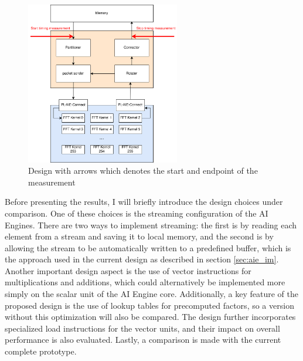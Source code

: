 \begin{figure}[h]
    \centering
    \includegraphics[width=0.6\textwidth]{images/timing.png}
    \captionsetup{justification=centering}
    \caption{Design with arrows which denotes the start and endpoint of the measurement}
    \label{fig:timing}
\end{figure}

Before presenting the results, I will briefly introduce the design choices under comparison. One of these choices is the streaming configuration of the AI Engines. There are two ways to implement streaming: the first is by reading each element from a stream and saving it to local memory, and the second is by allowing the stream to be automatically written to a predefined buffer, which is the approach used in the current design as described in section \ref{sec:aie_im}. Another important design aspect is the use of vector instructions for multiplications and additions, which could alternatively be implemented more simply on the scalar unit of the AI Engine core. Additionally, a key feature of the proposed design is the use of lookup tables for precomputed factors, so a version without this optimization will also be compared. The design further incorporates specialized load instructions for the vector units, and their impact on overall performance is also evaluated. Lastly, a comparison is made with the current complete prototype.

